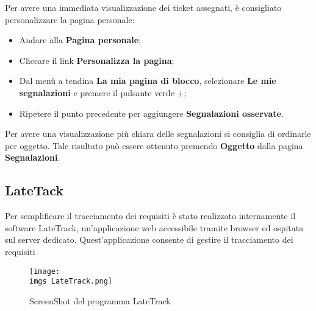 	Per avere una immediata visualizzazione dei ticket assegnati, è consigliato personalizzare 
	la pagina personale: 
	\begin{itemize}
		\item Andare alla \textbf{Pagina personale}; 
		\item Cliccare il link \textbf{Personalizza la pagina}; 
		\item Dal menù a tendina \textbf{La mia pagina di blocco}, selezionare \textbf{Le mie segnalazioni} 
		e premere il pulsante verde +; 
		\item Ripetere il punto precedente per aggiungere \textbf{Segnalazioni osservate}. 
	
	\end{itemize}

	Per avere una visualizzazione più chiara delle segnalazioni si consiglia di ordinarle per 
	oggetto. Tale risultato può essere ottenuto premendo \textbf{Oggetto} dalla pagina \textbf{Segnalazioni}.

\subsection{LateTack}
Per semplificare il tracciamento dei requisiti è stato realizzato internamente il software
LateTrack, un’applicazione web accessibile tramite browser ed ospitata sul server dedicato.
Quest’applicazione consente di gestire il tracciamento dei requisiti

\begin{figure}
\texttt{[image: \\imgs LateTrack.png]}
  \caption{ScreenShot del programma LateTrack}
  \label{fig:lateTrack}
\end{figure}
